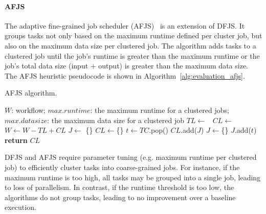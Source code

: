 \documentclass[final,5p,times,twocolumn]{elsarticle}
\begin{document}
\paragraph{\textbf{AFJS}}
The adaptive fine-grained job scheduler (AFJS)~\cite{Liu2009} is an extension of DFJS. It groups tasks not only based on the maximum runtime defined per cluster job, but also on the maximum data size per clustered job. The algorithm adds tasks to a clustered job until the job's runtime is greater than the maximum runtime or the job's total data size (input + output) is greater than the maximum data size. The AFJS heuristic pseudocode is shown in Algorithm~\ref{alg:evaluation_afjs}. 

\begin{algorithm}[!htb]
	\caption{ AFJS algorithm.}
	\footnotesize
	\label{alg:evaluation_afjs}
	\begin{algorithmic}[1]
		\Require $W$: workflow; $max.runtime$: the maximum runtime for a clustered jobs; $max.datasize$: the maximum data size for a clustered job
				\State $TL\gets $\  
				\State $CL\gets$  \  
				\State $W \gets W - TL + CL$   
			\EndFor
		\EndProcedure
			\State $J\gets$ \{\}
			\State $CL\gets$\{\}
				\State $t \gets TC$.pop() 
				\State	$CL$.add($J$)
				\State	$J \gets$\{\}
				\EndIf	
				\State $J$.add($t$)
			\EndWhile
			\State \textbf{return} $CL$
		\EndProcedure
	\end{algorithmic}
\end{algorithm}

DFJS and AFJS require parameter tuning (e.g. maximum runtime per clustered job) to efficiently cluster tasks into coarse-grained jobs. For instance, if the maximum runtime is too high, all tasks may be grouped into a single job, leading to loss of parallelism. In contrast, if the runtime threshold is too low, the algorithms do not group tasks, leading to no improvement over a baseline execution. 
\end{document}
